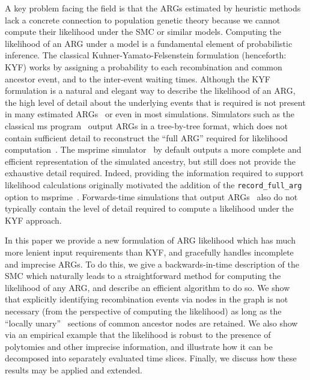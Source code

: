 \documentclass{article}
\begin{document}
A key problem facing the field is that the ARGs estimated by heuristic 
methods lack a concrete connection to population genetic theory because
we cannot compute their likelihood under the SMC or similar models. 
Computing the likelihood of an ARG under a model is a fundamental element of
probabilistic inference. The classical Kuhner-Yamato-Felsenstein
\citeyearpar{kuhner_maximum_2000} formulation (henceforth: KYF)
works by assigning a probability to each recombination and common
ancestor event, and to the inter-event  waiting times.
Although the KYF formulation is a natural and elegant way to describe
the likelihood of an ARG, the high level of detail about the underlying
events that is required is not present
in many estimated ARGs~\citep{wong_general_2023} or even in most simulations.
Simulators such as the classical ms
program~\citep{hudson_generating_2002} output ARGs in a tree-by-tree format,
which does not contain sufficient detail to reconstruct
the ``full ARG'' required for likelihood
computation~\citep{wong_general_2023}. 
The msprime
simulator~\citep{kelleher_efficient_2016,baumdicker_efficient_2021}
by default outputs a more complete and efficient representation of
the simulated ancestry, but still does not provide the exhaustive
detail required.
Indeed, providing the information required to
support likelihood calculations originally motivated the addition of
the \texttt{record\_full\_arg}
option to msprime~\citep{baumdicker_efficient_2021}.
Forwards-time simulations that output
ARGs~\citep{kelleher_efficient_2018,haller_tree_2018} also do not
typically contain the level of detail required to compute a likelihood under
the KYF approach.


In this paper we provide a new formulation of ARG likelihood which
has much more lenient input requirements than KYF, and gracefully handles
incomplete and imprecise ARGs. 
To do this, we give a backwards-in-time description of the SMC
which naturally leads to a straightforward method for computing the likelihood
of any ARG, and describe an efficient algorithm to do so.
We show that explicitly identifying recombination events via nodes
in the graph is not necessary
(from the perspective of computing the likelihood)
as long as the ``locally
unary''~\citep{wong_general_2023,fritze2024forest} sections of common ancestor
nodes are retained.
We also show via an empirical example that the likelihood is
robust to the presence of polytomies and other imprecise
information, and illustrate how it can be
decomposed into separately evaluated time slices.
Finally, we discuss how these results may be applied and extended.
\end{document}

